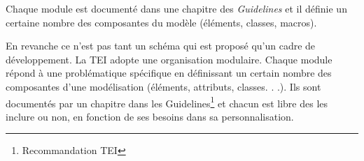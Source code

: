 \documentclass[12pt,a4paper,oneside]{book} %
\begin{document}
Chaque module est documenté dans une chapitre des \textit{Guidelines} et il définie un certaine nombre des composantes du modèle (éléments, classes, macros).
 


 En revanche ce n'est pas tant un schéma qui est proposé qu'un cadre de développement. La TEI adopte une organisation modulaire. Chaque module répond à une problématique spécifique en définissant un certain nombre des composantes d'une modélisation (éléments, attributs, classes. . .). Ils sont documentés par un chapitre dans les Guidelines\footnote{Recommandation TEI} et chacun est libre des les inclure ou non, en fonction de ses besoins dans sa personnalisation.
\end{document}
